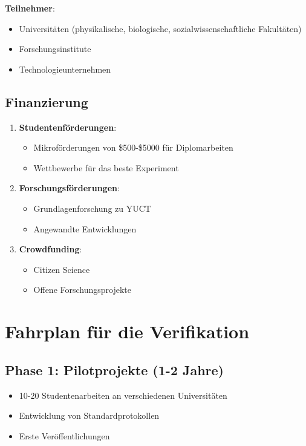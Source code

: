 \documentclass[12pt,a4paper]{article}
\begin{document}
	\textbf{Teilnehmer}:
	\begin{itemize}
		\item Universitäten (physikalische, biologische, sozialwissenschaftliche Fakultäten)
		\item Forschungsinstitute
		\item Technologieunternehmen
	\end{itemize}
	
	\subsection{Finanzierung}
	
	\begin{enumerate}
		\item \textbf{Studentenförderungen}:
		\begin{itemize}
			\item Mikroförderungen von \$500-\$5000 für Diplomarbeiten
			\item Wettbewerbe für das beste Experiment
		\end{itemize}
		
		\item \textbf{Forschungsförderungen}:
		\begin{itemize}
			\item Grundlagenforschung zu YUCT
			\item Angewandte Entwicklungen
		\end{itemize}
		
		\item \textbf{Crowdfunding}:
		\begin{itemize}
			\item Citizen Science
			\item Offene Forschungsprojekte
		\end{itemize}
	\end{enumerate}
	
	\section{Fahrplan für die Verifikation}
	
	\subsection{Phase 1: Pilotprojekte (1-2 Jahre)}
	\begin{itemize}
		\item 10-20 Studentenarbeiten an verschiedenen Universitäten
		\item Entwicklung von Standardprotokollen
		\item Erste Veröffentlichungen
	\end{itemize}
	
\end{document}
